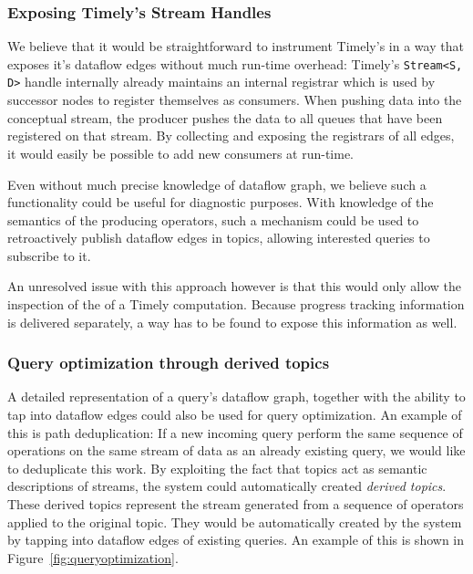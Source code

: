 
\subsubsection{Exposing Timely's Stream Handles}

We believe that it would be straightforward to instrument Timely's in a way
that exposes it's dataflow edges without much run-time overhead: Timely's
\lstinline{Stream<S, D>} handle internally already maintains an internal
registrar which is used by successor nodes to register themselves as consumers.
When pushing data into the conceptual stream, the producer pushes the data to
all queues that have been registered on that stream. By collecting and exposing
the registrars of all edges, it would easily be possible to add new consumers
at run-time.

Even without much precise knowledge of dataflow graph, we believe
such a functionality could be useful for diagnostic purposes. With knowledge
of the semantics of the producing operators, such a mechanism could be used
to retroactively publish dataflow edges in topics, allowing interested queries
to subscribe to it.

An unresolved issue with this approach however is that this would only allow
the inspection of the  of a Timely computation. Because
progress tracking information is delivered separately, a way has to be found to
expose this information as well.

\subsubsection{Query optimization through derived topics}

A detailed representation of a query's dataflow graph, together with the ability
to tap into dataflow edges could also be used for query optimization. An example
of this is path deduplication: If a new incoming query perform the same
sequence of operations on the same stream of data as an already existing
query, we would like to deduplicate this work. By exploiting the fact that
topics act as semantic descriptions of streams, the system could automatically
created \emph{derived topics}. These derived topics represent the stream
generated from a sequence of operators applied to the original topic. They would
be automatically created by the system by tapping into dataflow edges of
existing queries. An example of this is shown in Figure~\ref{fig:queryoptimization}.

